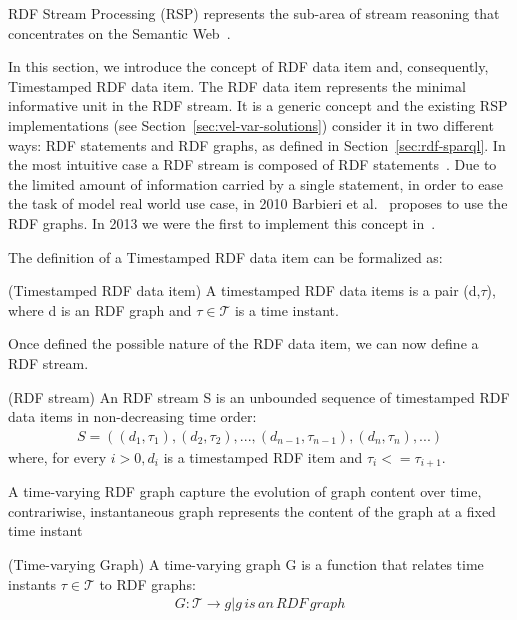 RDF Stream Processing (RSP) represents the sub-area of stream reasoning that concentrates on the Semantic Web~\cite{DBLP:conf/debs/ValleDM16}.

In this section, we introduce the concept of RDF data item and, consequently, Timestamped RDF data item.
The RDF data item represents the minimal informative unit in the RDF stream. It is a generic concept and the existing RSP implementations (see Section~\ref{sec:vel-var-solutions}) consider it in two different ways: RDF statements and RDF graphs, as defined in Section~\ref{sec:rdf-sparql}.
In the most intuitive case a RDF stream is composed of RDF statements~\cite{DBLP:conf/fis/ValleCBBC08}.
Due to the limited amount of information carried by a single statement, in order to ease the task of model real world use case, in 2010 Barbieri et al.~\cite{DBLP:conf/www/BarbieriV10} proposes to use the RDF graphs. In 2013 we were the first to implement this concept in~\cite{DBLP:conf/semweb/BalduiniVDTPC13}.

The definition of a Timestamped RDF data item can be formalized as:

\begin{Definition}
(Timestamped RDF data item) A timestamped RDF data items is a pair (d,$\tau$), where d is an RDF graph and $\tau \in \mathcal{T}$ is a time instant. 
\end{Definition}

Once defined the possible nature of the RDF data item, we can now define a RDF stream.
\begin{Definition}
(RDF stream) An RDF stream S is an unbounded sequence of timestamped RDF data items in non-decreasing time order:
\noindent\begin{align*}
S = ((d_1, \tau_1), (d_2, \tau_2), ..., (d_{n-1}, \tau_{n-1}), (d_n, \tau_n), ...)
\end{align*}  
where, for every $i > 0, d_i$ is a timestamped RDF item and $\tau_i <= \tau_{i+1}$.
\end{Definition}

A time-varying RDF graph capture the evolution of graph content over time, contrariwise, instantaneous graph represents the content of the graph at a fixed time instant

\begin{Definition}
(Time-varying Graph) A time-varying graph G is a function that relates time instants $\tau \in \mathcal{T}$ to RDF graphs:
\noindent\begin{align*}
G : \mathcal{T} \rightarrow {g | g\, is\, an\, RDF\, graph}
\end{align*}
\end{Definition}

